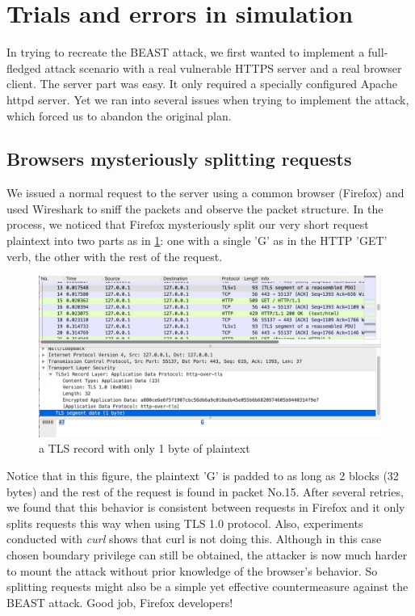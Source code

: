 \documentclass{acm_proc_article-sp}
\begin{document}
\section{Trials and errors in simulation}
In trying to recreate the BEAST attack, we first wanted to implement a full-fledged attack scenario
with a real vulnerable HTTPS server and a real browser client. The server part was easy. It only
required a specially configured Apache httpd server. Yet we ran into several issues when trying to
implement the attack, which forced us to abandon the original plan.
\subsection{Browsers mysteriously splitting requests}
We issued a normal request to the server using a common browser (Firefox) and used Wireshark to
sniff the packets and observe the packet structure. In the process, we noticed that Firefox
mysteriously split our very short request plaintext into two parts as in \ref{fig:split}:
one with a single 'G' as in the HTTP 'GET' verb, the other with the rest of the request.

\begin{figure}[htb]
    \centering
    \includegraphics[keepaspectratio, width=\linewidth]{./figures/split.png}
    \caption{a TLS record with only 1 byte of plaintext}
    \label{fig:split}
\end{figure}
Notice that in this figure, the plaintext 'G' is padded to as long as 2 blocks (32 bytes) and the rest of
the request is found in packet No.15.
After several retries, we found that this behavior is consistent between requests in Firefox and it only
splits requests this way when using TLS 1.0 protocol. Also, experiments conducted with \textit{curl}
shows that curl is not doing this. Although in this case chosen boundary privilege can still be
obtained, the attacker is now much harder to mount the attack without prior knowledge of the
browser's behavior. So splitting requests might also be a simple yet effective countermeasure
against the BEAST attack. Good job, Firefox developers!
\end{document}
